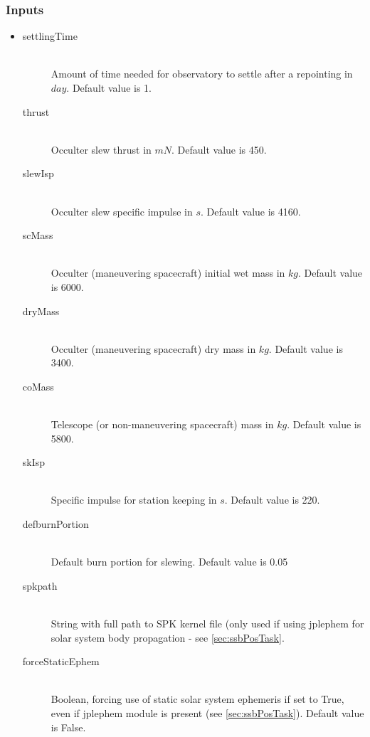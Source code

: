 \documentclass[cleanfoot]{asme2ej}
\begin{document}
\subsubsection*{Inputs}
\begin{itemize}
    \item
        \begin{description}
            \item[settlingTime] \hfill \\
            Amount of time needed for observatory to settle after a repointing in $ day $. Default value is 1.
            \item[thrust] \hfill \\
            Occulter slew thrust in $ mN $. Default value is 450.
            \item[slewIsp] \hfill \\
            Occulter slew specific impulse in $ s $. Default value is 4160.
            \item[scMass] \hfill \\
            Occulter (maneuvering spacecraft) initial wet mass in $ kg $. Default value is 6000.
            \item[dryMass] \hfill \\
            Occulter (maneuvering spacecraft) dry mass in $ kg $. Default value is 3400.
            \item[coMass] \hfill \\
            Telescope (or non-maneuvering spacecraft) mass in $ kg $. Default value is 5800.
            \item[skIsp] \hfill \\
            Specific impulse for station keeping in $ s $. Default value is 220.
            \item[defburnPortion] \hfill \\
            Default burn portion for slewing. Default value is 0.05
            \item[spkpath] \hfill\\
            String with full path to SPK kernel file (only used if using jplephem for solar system body propagation - see \ref{sec:ssbPosTask}.
            \item[forceStaticEphem] \hfill \\
            Boolean, forcing use of static solar system ephemeris if set to True, even if jplephem module is present (see \ref{sec:ssbPosTask}).  Default value is False.
        \end{description}
\end{itemize}
\end{document}
